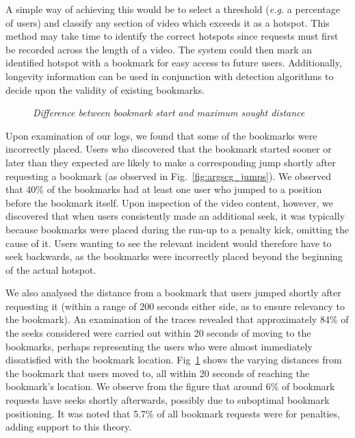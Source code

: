 \documentclass[letterpaper,nocopyrightspace]{sig-alternate}
\newcommand{\capttext}{\protect\centering\em}
\begin{document}
A simple way of achieving this would be to select a threshold
(\emph{e.g.} a percentage of users) and classify any section of
video which exceeds it as a hotspot. This method may take time to
identify the correct hotspots since requests must first be recorded
across the length of a video. The system could then mark an
identified hotspot with a bookmark for easy access to future users.
Additionally, longevity information can be used in conjunction with
detection algorithms to decide upon the validity of existing
bookmarks.


\begin{figure}[tb]
\centering {} \caption{\capttext Difference between bookmark
start and maximum sought distance} \label{fig:bookmark_rewind_diffs}
\end{figure}

Upon examination of our logs, we found that some of the bookmarks
were incorrectly placed. Users who discovered that the bookmark
started sooner or later than they expected are likely to make a
corresponding jump shortly after requesting a bookmark (as observed
in Fig.~\ref{fig:argscg_jumps}). We observed that 40\% of the
bookmarks had at least one user who jumped to a position before the
bookmark itself. Upon inspection of the video content, however, we
discovered that when users consistently made an additional seek, it
was typically because bookmarks were placed during the run-up to a
penalty kick, omitting the cause of it. Users wanting to see the
relevant incident would therefore have to seek backwards, as the
bookmarks were incorrectly placed beyond the beginning of the actual
hotspot.

We also analysed the distance from a bookmark that users jumped
shortly after requesting it (within a range of 200 seconds either
side, as to ensure relevancy to the bookmark). An examination of the
traces revealed that approximately 84\% of the seeks considered were
carried out within 20 seconds of moving to the bookmarks, perhaps
representing the users who were almost immediately dissatisfied with
the bookmark location. Fig~\ref{fig:bookmark_rewind_diffs} shows the
varying distances from the bookmark that users moved to, all within
20 seconds of reaching the bookmark's location. We observe from the
figure that around 6\% of bookmark requests have seeks shortly
afterwards, possibly due to suboptimal bookmark positioning. It was
noted that 5.7\% of all bookmark requests were for penalties, adding
support to this theory.
\end{document}
